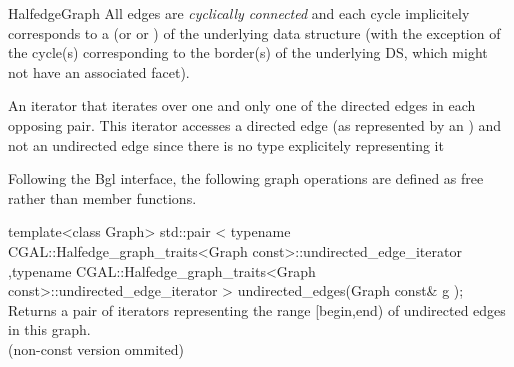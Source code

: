 \begin{ccRefConcept}{HalfedgeGraph}
All edges are {\em cyclically connected} and each cycle implicitely
corresponds to a  (or  or ) of the
underlying data structure (with the exception of the cycle(s)
corresponding to the border(s) of the underlying DS, which might not
have an associated facet).


\ccRefines
{}

\ccTypes
  {An iterator that iterates over one and only one of the directed edges
  in each opposing pair. This iterator accesses a directed edge 
  (as represented by an ) and not an undirected edge 
  since there is no type explicitely representing it}{}
  
\ccOperations

Following the {\sc Bgl} interface, the following graph operations are defined as free rather than member functions.

  \ccFunction
  {template<class Graph>
  std::pair < typename CGAL::Halfedge_graph_traits<Graph const>::undirected_edge_iterator
             ,typename CGAL::Halfedge_graph_traits<Graph const>::undirected_edge_iterator
             >   
  undirected_edges(Graph const& g );
  }
  {Returns a pair of iterators representing the range [begin,end) 
  of undirected edges in this graph.\\
  (non-const version ommited)
  }

\ccHasModels
{}\\
\\

\end{ccRefConcept}

